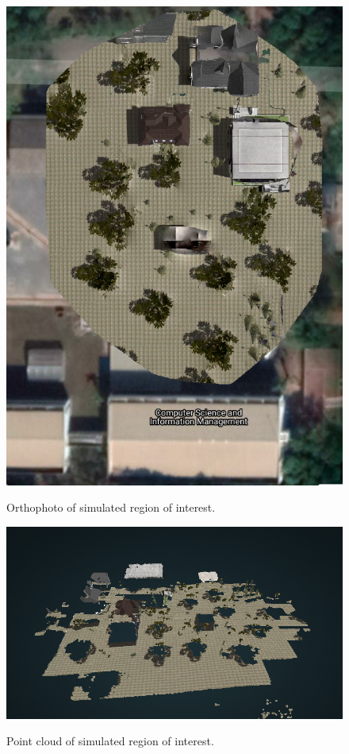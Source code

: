 \begin{figure}
	\centering
	\caption[Orthophoto of simulated region of interest.]{\small Orthophoto of simulated region of interest.} 
	\includegraphics[width=5in]{figures/experiment/orthophoto-simulation}
	\label{fig:orthophoto-simulated}
\end{figure}

\begin{figure}
	\centering
	\caption[Point cloud of simulated region of interest.]{\small Point cloud of simulated region of interest.} 
	\includegraphics[width=5in]{figures/experiment/simulated-pointcould}
	\label{fig:simulated-pointcloud}
\end{figure}

